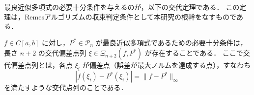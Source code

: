     最良近似多項式の必要十分条件を与えるのが，以下の交代定理である．
    この定理は，Remesアルゴリズムの収束判定条件として本研究の根幹をなすものである．

    \begin{theorem}[交代定理]

      \label{thm:koutaiteiri}
      $f \in C[a, b]$ に対し，$P^* \in \mathcal{P}_n$ が最良近似多項式であるための必要十分条件は，長さ $n+2$ の交代偏差点列 $\xi \in \Xi_{n+2}(f, P^*)$ が存在することである．
      ここで交代偏差点列とは，各点 $\xi_i$ が偏差点（誤差が最大ノルムを達成する点），すなわち
      \begin{equation}
        |f(\xi_i) - P^*(\xi_i)| = \|f - P^*\|_\infty
      \end{equation}
      を満たすような交代点列のことである．
    \end{theorem}

